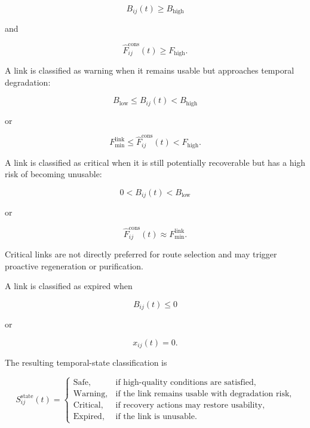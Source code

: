 \begin{equation}
    B_{ij}(t)
    \geq
    B_{\mathrm{high}}
\end{equation}

and

\begin{equation}
    \widehat{F}_{ij}^{\mathrm{cons}}(t)
    \geq
    F_{\mathrm{high}}.
\end{equation}

A link is classified as warning when it remains usable but approaches temporal degradation:

\begin{equation}
    B_{\mathrm{low}}
    \leq
    B_{ij}(t)
    <
    B_{\mathrm{high}}
\end{equation}

or

\begin{equation}
    F_{\min}^{\mathrm{link}}
    \leq
    \widehat{F}_{ij}^{\mathrm{cons}}(t)
    <
    F_{\mathrm{high}}.
\end{equation}

A link is classified as critical when it is still potentially recoverable but has a high risk of becoming unusable:

\begin{equation}
    0
    <
    B_{ij}(t)
    <
    B_{\mathrm{low}}
\end{equation}

or

\begin{equation}
    \widehat{F}_{ij}^{\mathrm{cons}}(t)
    \approx
    F_{\min}^{\mathrm{link}}.
\end{equation}

Critical links are not directly preferred for route selection and may trigger proactive regeneration or purification.

A link is classified as expired when

\begin{equation}
    B_{ij}(t)
    \leq
    0
\end{equation}

or

\begin{equation}
    x_{ij}(t)
    =
    0.
\end{equation}

The resulting temporal-state classification is

\begin{equation}
    S_{ij}^{\mathrm{state}}(t)
    =
    \begin{cases}
        \mathrm{Safe},
        & \text{if high-quality conditions are satisfied},\\
        \mathrm{Warning},
        & \text{if the link remains usable with degradation risk},\\
        \mathrm{Critical},
        & \text{if recovery actions may restore usability},\\
        \mathrm{Expired},
        & \text{if the link is unusable}.
    \end{cases}
\end{equation}


